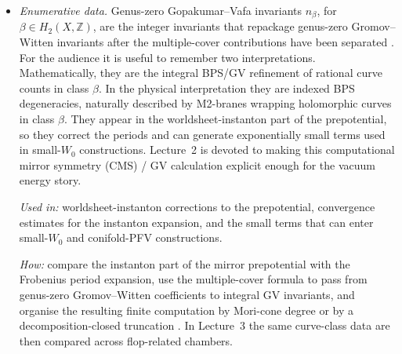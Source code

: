 \begin{itemize}[leftmargin=*]
    \par\smallskip
    \noindent\emph{Used in:} the flux superpotential $W_{\rm flux}$,
    in particular the stabilisation of complex structure moduli.

    \par\noindent\emph{How:} construct the GKZ /
    Picard--Fuchs system from the Batyrev mirror data, compute the
    Frobenius solutions near an LCS point, and then match the
    logarithmic solutions to an integral symplectic period basis using
    the large volume monodromy on the mirror side
    \cite{Hosono:1993qy,CoxKatz:1999,Demirtas:2023als}.

    \item \emph{Enumerative data.}
    Genus-zero Gopakumar--Vafa invariants $n_\beta$, for
    $\beta\in H_2(X,\mathbb{Z})$, are the integer invariants that
    repackage genus-zero Gromov--Witten invariants after the
    multiple-cover contributions have been separated
    \cite{Gopakumar:1998jq,Demirtas:2023als}. For the audience it is
    useful to remember two interpretations. Mathematically, they are
    the integral BPS/GV refinement of rational curve counts in class
    $\beta$. In the physical interpretation they are indexed BPS
    degeneracies, naturally described by M2-branes wrapping
    holomorphic curves in class $\beta$. They appear in the
    worldsheet-instanton part of the prepotential, so they correct
    the periods and can generate exponentially small terms used in
    small-$W_0$ constructions. Lecture~2 is devoted to making this
    computational mirror symmetry (CMS) / GV calculation explicit
    enough for the vacuum energy story.

    \par\smallskip
    \noindent\emph{Used in:} worldsheet-instanton corrections to the
    prepotential, convergence estimates for the instanton expansion,
    and the small terms that can enter small-$W_0$ and conifold-PFV
    constructions.

    \par\noindent\emph{How:} compare the instanton part of
    the mirror prepotential with the Frobenius period expansion, use
    the multiple-cover formula to pass from genus-zero
    Gromov--Witten coefficients to integral GV invariants, and organise
    the resulting finite computation by Mori-cone degree or by a
    decomposition-closed truncation
    \cite{Gopakumar:1998jq,Hosono:1993qy,Demirtas:2023als}.  In
    Lecture~3 the same curve-class data are then compared across
    flop-related chambers.
    
\end{itemize}


